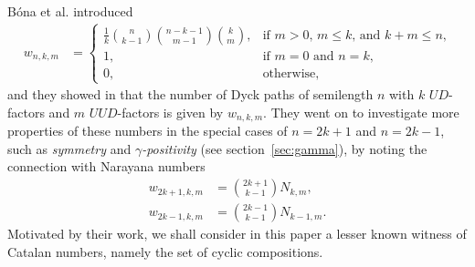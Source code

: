 \documentclass[reqno]{amsart}
\numberwithin{equation}{section}
\theoremstyle{definition}
\theoremstyle{named}
\begin{document}
B\'ona et al. introduced
\begin{align}\label{formula for w}
w_{n,k,m} &= \begin{cases}
\frac{1}{k}\binom{n}{k-1}\binom{n-k-1}{m-1}\binom{k}{m}, & \text{if $m>0$, $m\le k$, and $k+m\le n$,}\\
1, & \text{if $m=0$ and $n=k$,}\\
0, & \text{otherwise,}
\end{cases}
\end{align}
and they showed in \cite[Thm.~1.2]{BDL2022} that the number of Dyck paths of semilength $n$ with $k$ $UD$-factors and $m$ $UUD$-factors is given by $w_{n,k,m}$. They went on to investigate more properties of these numbers in the special cases of $n=2k+1$ and $n=2k-1$, such as {\it symmetry} and {\it $\gamma$-positivity} (see section~\ref{sec:gamma}), by noting the connection with Narayana numbers
\begin{align}\label{id:w-Narayana}
w_{2k+1,k,m} &= \binom{2k+1}{k-1}N_{k,m},\\
w_{2k-1,k,m} &= \binom{2k-1}{k-1}N_{k-1,m}.
\label{id:w-Narayana2}
\end{align}
Motivated by their work, we shall consider in this paper a lesser known witness of Catalan numbers, namely the set of cyclic compositions.
\end{document}
